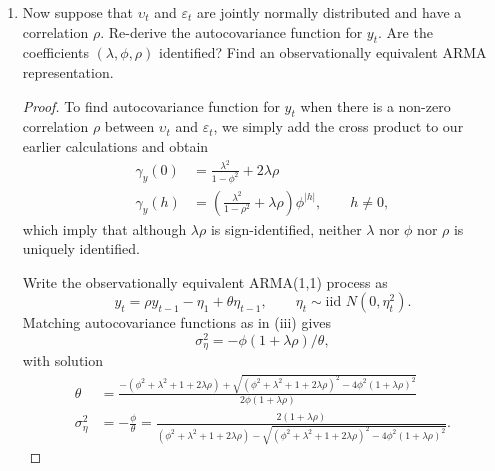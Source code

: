 \documentclass[oneside,reqno]{amsart}
\newcommand{\eps}{\varepsilon}
\newcommand{\ups}{\upsilon}
\theoremstyle{definition}
\begin{document}
\begin{enumerate}
\begin{proof}
\begin{align*}
	-\phi(1 + 2 \theta\phi + \theta^2 ) &= \theta - \theta \phi^2 + \theta \lambda^2
\end{align*}
or 
\[
	\phi \theta^2 + \theta(\phi^2 + \lambda^2 + 1) + \phi = 0
\]
This quadratic equation in $\theta$ has two solutions given by
\[
	\theta = \frac{-(\phi^2 + \lambda^2 + 1) \pm \sqrt{(\phi^2 + \lambda^2 + 1)^2 - 4 \phi^2}}{2 \phi}
\]
To obtain a single solution, we can require that the ARMA(1,1) process is invertible (i.e., $|\theta| < 1$): 
\begin{align*}
	\theta &= \frac{-(\phi^2 + \lambda^2 + 1) + \sqrt{(\phi^2 + \lambda^2 + 1)^2 - 4 \phi^2}}{2 \phi} \\
	\sigma_\eta^2 &= -\frac{\phi}{\theta} = \frac{2}{(\phi^2 + \lambda^2 + 1) - \sqrt{(\phi^2 + \lambda^2 + 1) - 4 \phi^2}}.
\end{align*}
\end{proof}


\item
Now suppose that $\ups_t$ and $\eps_t$ are jointly normally distributed and have a correlation $\rho$. Re-derive the autocovariance function for $y_t$. Are the coefficients $(\lambda, \phi, \rho)$ identified? Find an observationally equivalent ARMA representation.

\begin{proof}
To find autocovariance function for $y_t$ when there is a non-zero correlation $\rho$ between $\ups_t$ and $\eps_t$, we simply add the cross product to our earlier calculations and obtain 
\begin{align*}
	\gamma_y(0) &= \frac{\lambda^2}{1-\phi^2} + 2 \lambda \rho \\
	\gamma_y(h) &=  \left(\frac{\lambda^2}{1-\rho^2} + \lambda \rho \right)\phi^{|h|} , \qquad h \neq 0,
\end{align*}
which imply that although $\lambda \rho$ is sign-identified, neither $\lambda$ nor $\phi$ nor $\rho$ is uniquely identified. 
\par
Write the observationally equivalent ARMA(1,1) process as
\[
	y_t = \rho y_{t-1} -\eta_1 + \theta \eta_{t-1},
	\qquad \eta_t \sim \text{iid } N(0, \eta_t^2).
\]
Matching autocovariance functions as in (iii) gives
\[
	\sigma_\eta^2 = - \phi(1 + \lambda \rho)/\theta,
\]
with solution 
\begin{align*}
	\theta &= \frac{-(\phi^2 + \lambda^2 + 1 + 2 \lambda \rho) + \sqrt{(\phi^2 + \lambda^2 + 1 + 2 \lambda \rho)^2 - 4 \phi^2 (1 + \lambda \rho)^2}}{2 \phi (1 + \lambda \rho)} \\
	\sigma_\eta^2 &= -\frac{\phi}{\theta} = \frac{2 (1 + \lambda \rho)}{(\phi^2 + \lambda^2 + 1 + 2 \lambda \rho) - \sqrt{(\phi^2 + \lambda^2 + 1 + 2 \lambda \rho)^2 - 4 \phi^2 (1 + \lambda \rho)^2}}.
\end{align*}
\end{proof}


\end{enumerate}
\end{document}

